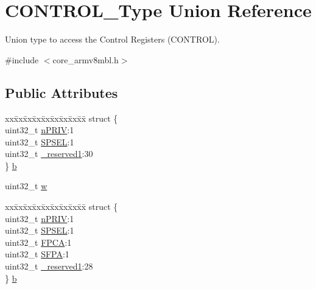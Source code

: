 \hypertarget{union_c_o_n_t_r_o_l___type}{}\section{C\+O\+N\+T\+R\+O\+L\+\_\+\+Type Union Reference}
\label{union_c_o_n_t_r_o_l___type}


Union type to access the Control Registers (C\+O\+N\+T\+R\+OL).  




{\ttfamily \#include $<$core\+\_\+armv8mbl.\+h$>$}

\subsection*{Public Attributes}
\begin{DoxyCompactItemize}
\item 
\begin{tabbing}
xx\=xx\=xx\=xx\=xx\=xx\=xx\=xx\=xx\=\kill
struct \{\\
\>uint32\_t \mbox{\hyperlink{union_c_o_n_t_r_o_l___type_a35c1732cf153b7b5c4bd321cf1de9605}{nPRIV}}:1\\
\>uint32\_t \mbox{\hyperlink{union_c_o_n_t_r_o_l___type_a8cc085fea1c50a8bd9adea63931ee8e2}{SPSEL}}:1\\
\>uint32\_t \mbox{\hyperlink{union_c_o_n_t_r_o_l___type_aa7a5662079a447f801034d108f80ce49}{\_reserved1}}:30\\
\} \mbox{\hyperlink{union_c_o_n_t_r_o_l___type_adc6a38ab2980d0e9577b5a871da14eb9}{b}}\\

\end{tabbing}\item 
uint32\+\_\+t \mbox{\hyperlink{union_c_o_n_t_r_o_l___type_a6b642cca3d96da660b1198c133ca2a1f}{w}}
\item 
\begin{tabbing}
xx\=xx\=xx\=xx\=xx\=xx\=xx\=xx\=xx\=\kill
struct \{\\
\>uint32\_t \mbox{\hyperlink{union_c_o_n_t_r_o_l___type_a35c1732cf153b7b5c4bd321cf1de9605}{nPRIV}}:1\\
\>uint32\_t \mbox{\hyperlink{union_c_o_n_t_r_o_l___type_a8cc085fea1c50a8bd9adea63931ee8e2}{SPSEL}}:1\\
\>uint32\_t \mbox{\hyperlink{union_c_o_n_t_r_o_l___type_ac62cfff08e6f055e0101785bad7094cd}{FPCA}}:1\\
\>uint32\_t \mbox{\hyperlink{union_c_o_n_t_r_o_l___type_adab539fdfb991718401475bf6853669c}{SFPA}}:1\\
\>uint32\_t \mbox{\hyperlink{union_c_o_n_t_r_o_l___type_aa7a5662079a447f801034d108f80ce49}{\_reserved1}}:28\\
\} \mbox{\hyperlink{union_c_o_n_t_r_o_l___type_ae3b4861e899b1f68818b60033a3914d9}{b}}\\


\end{tabbing}
\end{DoxyCompactItemize}
